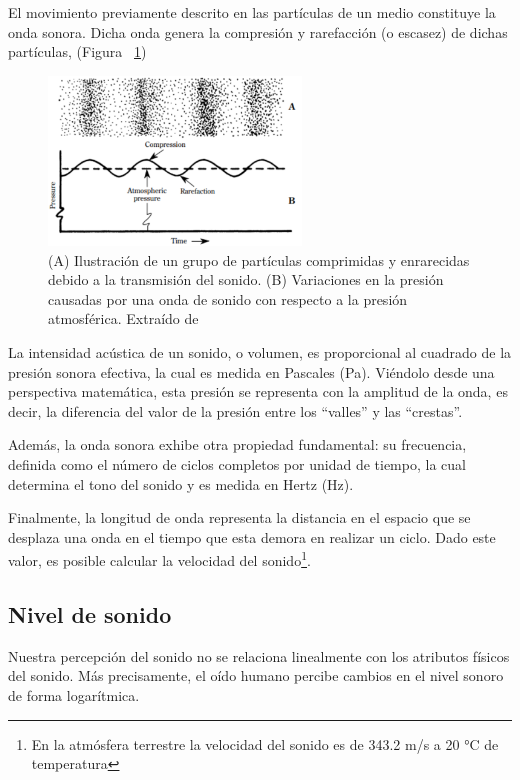 \documentclass{prgrado}
\begin{document}
El movimiento previamente descrito en las partículas de un medio constituye la onda sonora. Dicha onda genera la compresión y rarefacción (o escasez) de dichas partículas, (Figura ~\ref{fig:presion})

\begin{figure}[h!]
    \centering
    \includegraphics[width=0.6\textwidth]{figs/particle-pressure.png}
    \captionsetup{justification=centering}
    \caption{(A) Ilustración de un grupo de partículas comprimidas y enrarecidas debido a la transmisión del sonido. (B) Variaciones en la presión causadas por una onda de sonido con respecto a la presión atmosférica. Extraído de \cite{Everest}}
    \label{fig:presion}
\end{figure}

La intensidad acústica de un sonido, o volumen, es proporcional al cuadrado de la presión sonora efectiva, la cual es medida en Pascales (Pa). Viéndolo desde una perspectiva matemática, esta presión se representa con la amplitud de la onda, es decir, la diferencia del valor de la presión entre los “valles” y las “crestas”.

Además, la onda sonora exhibe otra propiedad fundamental: su frecuencia, definida como el número de ciclos completos por unidad de tiempo, la cual determina el tono del sonido y es medida en Hertz (Hz).

Finalmente, la longitud de onda representa la distancia en el espacio que se desplaza una onda en el tiempo que esta demora en realizar un ciclo. Dado este valor, es posible calcular la velocidad del sonido\footnote{En la atmósfera terrestre la velocidad del sonido es de 343.2 m/s a 20 °C de temperatura}.

\subsection{Nivel de sonido}

Nuestra percepción del sonido no se relaciona linealmente con los atributos físicos del sonido. Más precisamente, el oído humano percibe cambios en el nivel sonoro de forma logarítmica.
\end{document}
